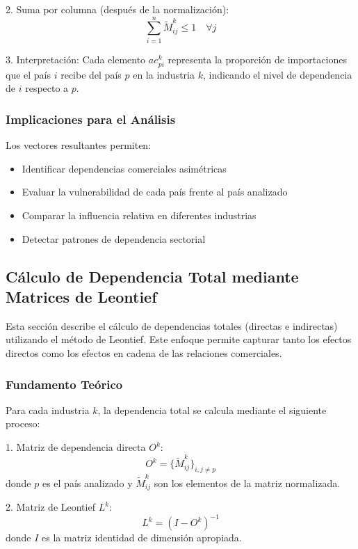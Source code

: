\documentclass[11pt,a4paper]{article}
\begin{document}
2. Suma por columna (después de la normalización):
\begin{equation}
\sum_{i=1}^n \tilde{M}^k_{ij} \leq 1 \quad \forall j
\end{equation}

3. Interpretación: Cada elemento $ae^k_{pi}$ representa la proporción de importaciones que el país $i$ recibe del país $p$ en la industria $k$, indicando el nivel de dependencia de $i$ respecto a $p$.

\subsubsection{Implicaciones para el Análisis}
Los vectores resultantes permiten:
\begin{itemize}
    \item Identificar dependencias comerciales asimétricas
    \item Evaluar la vulnerabilidad de cada país frente al país analizado
    \item Comparar la influencia relativa en diferentes industrias
    \item Detectar patrones de dependencia sectorial
\end{itemize}
\subsection{Cálculo de Dependencia Total mediante Matrices de Leontief}

Esta sección describe el cálculo de dependencias totales (directas e indirectas) utilizando el método de Leontief. Este enfoque permite capturar tanto los efectos directos como los efectos en cadena de las relaciones comerciales.

\subsubsection{Fundamento Teórico}

Para cada industria $k$, la dependencia total se calcula mediante el siguiente proceso:

1. Matriz de dependencia directa $O^k$:
\begin{equation}
O^k = \{\tilde{M}^k_{ij}\}_{i,j \neq p}
\end{equation}
donde $p$ es el país analizado y $\tilde{M}^k_{ij}$ son los elementos de la matriz normalizada.

2. Matriz de Leontief $L^k$:
\begin{equation}
L^k = (I - O^k)^{-1}
\end{equation}
donde $I$ es la matriz identidad de dimensión apropiada.
\end{document}
